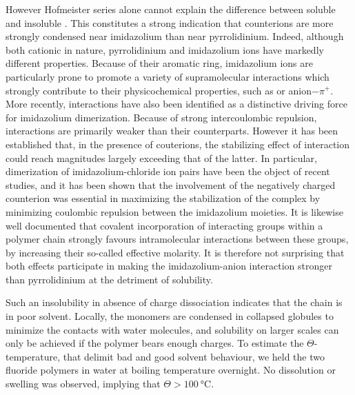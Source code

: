 \documentclass[journal=jacsat,manuscript=article]{achemso}
\begin{document}
However Hofmeister series alone cannot explain the difference between soluble  and insoluble . This constitutes a strong indication that counterions are more strongly condensed near imidazolium than near pyrrolidinium. Indeed, although both cationic in nature, pyrrolidinium and imidazolium ions have markedly different properties. Because of their aromatic ring, imidazolium ions are particularly prone to promote a variety of supramolecular interactions which strongly contribute to their physicochemical properties, such as \ce{\pi+-\pi} or anion$-\pi^+$.  More recently, \ce{\pi+-\pi+} interactions have also been identified as a distinctive driving force for imidazolium dimerization\cite{Geronimo2011}. Because of strong intercoulombic repulsion, \ce{\pi+-\pi+} interactions are primarily weaker than their \ce{\pi-\pi} counterparts. However it has been established that, in the presence of couterions, the stabilizing effect of \ce{\pi+-\pi+} interaction could reach magnitudes largely exceeding that of the latter\cite{Geronimo2011}. In particular, dimerization of imidazolium-chloride ion pairs have been the object of recent studies, and it has been shown that the involvement of the negatively charged counterion was essential in maximizing the stabilization of the \ce{\pi+-\pi+} complex by minimizing coulombic repulsion between the imidazolium moieties\cite{Matthews2014,Gao2015a}. It is likewise well documented that covalent incorporation of interacting groups within a polymer chain strongly favours intramolecular interactions between these groups, by increasing their so-called effective molarity\cite{Li2003,Mulder2004,Huerta2013}. It is therefore not surprising that both effects participate in making the imidazolium-anion interaction stronger than pyrrolidinium at the detriment of solubility.

Such an insolubility in absence of charge dissociation indicates that the chain is in poor solvent. Locally, the monomers are condensed in collapsed globules to minimize the contacts with water molecules, and solubility on larger scales can only be achieved if the polymer bears enough charges\cite{Khokhlov1980,Raphael1990}. To estimate the $\Theta$-temperature, that delimit bad and good solvent behaviour, we held the two fluoride polymers in water at boiling temperature overnight. No dissolution or swelling was observed, implying that $\Theta>\SI{100}{\celsius}$. %
\end{document}
